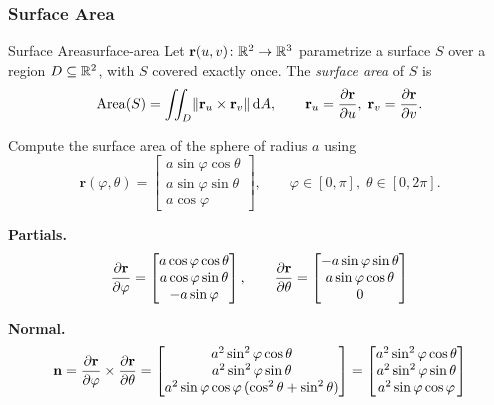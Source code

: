 \subsubsection{Surface Area}

\begin{definition}{Surface Area}{surface-area}
  Let $\mathbf{r}(u,v)\colon\mathbb{R}^2\to\mathbb{R}^3$ parametrize a surface $S$ over a region
  $D\subseteq\mathbb{R}^2$, with $S$ covered exactly once. The \emph{surface area} of $S$ is
  \[
    \operatorname{Area}(S) = \iint_D \lVert\mathbf{r}_u\times\mathbf{r}_v\rVert\,\mathrm{d}A,
    \qquad
    \mathbf{r}_u = \frac{\partial \mathbf{r}}{\partial u},\;\mathbf{r}_v = \frac{\partial \mathbf{r}}{\partial v}.
  \]
\end{definition}

\begin{example}
  Compute the surface area of the sphere of radius $a$ using
  \[
    \mathbf{r}(\varphi,\theta) =
    \begin{bmatrix}
      a\sin\varphi\cos\theta \\
      a\sin\varphi\sin\theta \\
      a\cos\varphi
    \end{bmatrix}
    ,\qquad \varphi\in[0,\pi],\;\theta\in[0,2\pi].
  \]

  \textbf{Partials.}
  \[
    \frac{\partial \mathbf{r}}{\partial \varphi} =
    \begin{bmatrix}
      a\cos\varphi\cos\theta \\
      a\cos\varphi\sin\theta \\
      -a\sin\varphi
    \end{bmatrix}
    ,\qquad
    \frac{\partial \mathbf{r}}{\partial \theta} =
    \begin{bmatrix}
      -a\sin\varphi\sin\theta \\
      a\sin\varphi\cos\theta  \\
      0
    \end{bmatrix}
  \]

  \textbf{Normal.}
  \[
    \mathbf{n} = \frac{\partial \mathbf{r}}{\partial \varphi}\times\frac{\partial \mathbf{r}}{\partial \theta}
    =
    \begin{bmatrix}
      a^2\sin^2\varphi\cos\theta \\
      a^2\sin^2\varphi\sin\theta \\
      a^2\sin\varphi\cos\varphi\,(\cos^2\theta+\sin^2\theta)
    \end{bmatrix}
    =
    \begin{bmatrix}
      a^2\sin^2\varphi\cos\theta \\
      a^2\sin^2\varphi\sin\theta \\
      a^2\sin\varphi\cos\varphi
    \end{bmatrix}
  \]


\end{example}
